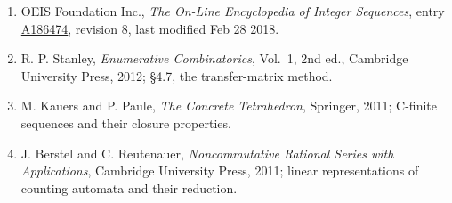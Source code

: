 \documentclass[11pt]{article}
\theoremstyle{definition}
\begin{document}
\begin{enumerate}

\item OEIS Foundation Inc., \emph{The On-Line Encyclopedia of Integer Sequences}, entry \href{https://oeis.org/A186474}{A186474}, revision 8, last modified Feb 28 2018.

\item R. P. Stanley, \emph{Enumerative Combinatorics}, Vol.~1, 2nd ed., Cambridge University Press, 2012; \S4.7, the transfer-matrix method.

\item M. Kauers and P. Paule, \emph{The Concrete Tetrahedron}, Springer, 2011; C-finite sequences and their closure properties.

\item J. Berstel and C. Reutenauer, \emph{Noncommutative Rational Series with Applications}, Cambridge University Press, 2011; linear representations of counting automata and their reduction.

\end{enumerate}
\end{document}
